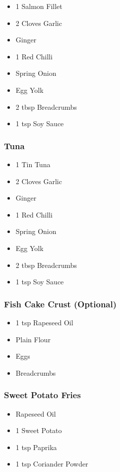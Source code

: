 \documentclass[11pt, english]{article}
\begin{document}
	\begin{itemize}
        \setlength\itemsep{0cm}
                \item 1 Salmon Fillet
		\item 2 Cloves Garlic
		\item Ginger
		\item 1 Red Chilli
		\item Spring Onion
		\item Egg Yolk
		\item 2 tbsp Breadcrumbs
		\item 1 tsp Soy Sauce
        \end{itemize}

		\subsubsection*{Tuna}

	\begin{itemize}
        \setlength\itemsep{0cm}
                \item 1 Tin Tuna
		\item 2 Cloves Garlic
		\item Ginger
		\item 1 Red Chilli
		\item Spring Onion
		\item Egg Yolk
		\item 2 tbsp Breadcrumbs
		\item 1 tsp Soy Sauce
        \end{itemize}

		\subsubsection*{Fish Cake Crust (Optional)}

	\begin{itemize}
        \setlength\itemsep{0cm}
                \item 1 tsp Rapeseed Oil
		\item Plain Flour
		\item Eggs
		\item Breadcrumbs
        \end{itemize}

		\subsubsection*{Sweet Potato Fries}

	\begin{itemize}
        \setlength\itemsep{0cm}
                \item Rapeseed Oil
		\item 1 Sweet Potato
		\item 1 tsp Paprika
		\item 1 tsp Coriander Powder
        \end{itemize}
\end{document}
